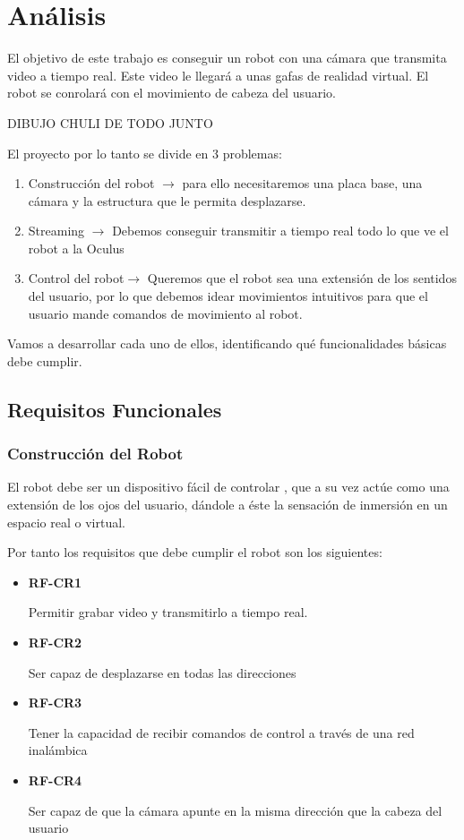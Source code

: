 \documentclass[twoside, 12pt]{epstfg}
\begin{document}
\section{Análisis}
El objetivo de este trabajo es conseguir un robot con una cámara que transmita video a tiempo real. Este video le llegará a unas gafas de realidad virtual. El robot se conrolará con el movimiento de cabeza del usuario.

DIBUJO CHULI DE TODO JUNTO

El proyecto por lo tanto se divide en 3 problemas:
\begin{enumerate}
	\item Construcción del robot $\rightarrow$ para ello necesitaremos una placa base, una cámara y la estructura que le permita desplazarse.
	\item Streaming $\rightarrow$ Debemos conseguir transmitir a tiempo real todo lo que ve el robot a la Oculus
	\item Control del robot$\rightarrow$ Queremos que el robot sea una extensión de los sentidos del usuario, por lo que debemos idear movimientos intuitivos para que el usuario mande comandos de movimiento al robot.
\end{enumerate}

Vamos a desarrollar cada uno de ellos, identificando qué funcionalidades básicas debe cumplir.

\subsection{Requisitos Funcionales}

\subsubsection{Construcción del Robot}



El robot debe ser un dispositivo fácil de controlar , que a su vez actúe como una extensión de los ojos del usuario, dándole a éste la sensación de inmersión en un espacio real o virtual.

Por tanto los requisitos que debe cumplir el robot son los siguientes:


\begin{itemize}
	\item \textbf{RF-CR1}
	
	Permitir grabar video y transmitirlo a tiempo real.
	
	
	\item\textbf{RF-CR2} 
	
	Ser capaz de desplazarse en todas las direcciones
	
	
	\item\textbf{RF-CR3}
	
	Tener la capacidad de recibir comandos de control a través de una red inalámbica
	
	
	\item\textbf{RF-CR4} 
	
	Ser capaz de que la cámara apunte en la misma dirección que la cabeza del usuario
\end{itemize}
\end{document}
